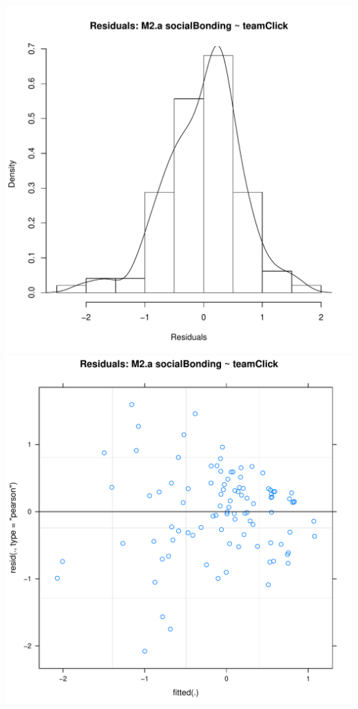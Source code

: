 \documentclass[12pt]{report}
\begin{document}


\centering
\newpage
\includegraphics[scale =.4]{../images/MLM2aHist.pdf}
\includegraphics[scale =.4]{../images/MLM2aScatter.pdf}
\end{document}
